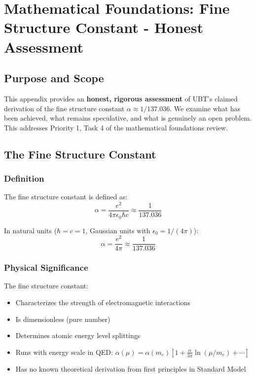 \section{Mathematical Foundations: Fine Structure Constant - Honest Assessment}
\label{app:alpha_status}

\subsection{Purpose and Scope}

This appendix provides an \textbf{honest, rigorous assessment} of UBT's claimed derivation of the fine structure constant $\alpha \approx 1/137.036$. We examine what has been achieved, what remains speculative, and what is genuinely an open problem. This addresses Priority 1, Task 4 of the mathematical foundations review.

\subsection{The Fine Structure Constant}

\subsubsection{Definition}

The fine structure constant is defined as:
\begin{equation}
\alpha = \frac{e^2}{4\pi\epsilon_0 \hbar c} \approx \frac{1}{137.036}
\end{equation}

In natural units ($\hbar = c = 1$, Gaussian units with $\epsilon_0 = 1/(4\pi)$):
\begin{equation}
\alpha = \frac{e^2}{4\pi} \approx \frac{1}{137.036}
\end{equation}

\subsubsection{Physical Significance}

The fine structure constant:
\begin{itemize}
\item Characterizes the strength of electromagnetic interactions
\item Is dimensionless (pure number)
\item Determines atomic energy level splittings
\item Runs with energy scale in QED: $\alpha(\mu) = \alpha(m_e) \left[1 + \frac{\alpha}{3\pi} \ln(\mu/m_e) + \cdots\right]$
\item Has no known theoretical derivation from first principles in Standard Model
\end{itemize}

